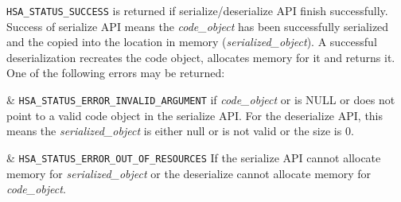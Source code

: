 \texttt{HSA\_STATUS\_SUCCESS} is returned if serialize/deserialize
API finish successfully. Success of serialize API means the
{\itshape code\_object} has been successfully serialized and the
copied into the location in memory ({\itshape serialized\_object}).
A successful deserialization recreates the code object, allocates
memory for it and returns it. One of the following errors may be
returned:
\begin{easylist}
& \texttt{HSA\_STATUS\_ERROR\_INVALID\_ARGUMENT} if {\itshape
code\_object} or is NULL or does not point to a valid code object in
the serialize API. For the deserialize API, this means the {\itshape
serialized\_object} is either null or is not valid or the size is 0.

& \texttt{HSA\_STATUS\_ERROR\_OUT\_OF\_RESOURCES} If the serialize API
cannot allocate memory for {\itshape serialized\_object} or the
deserialize cannot allocate memory for {\itshape code\_object}.
\end{easylist}


